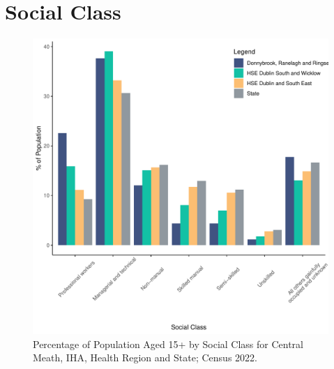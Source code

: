 \documentclass{article}
\begin{document}
\section{Social Class}\label{sect:SC}
\begin{figure}[H]
	\centering
	\includegraphics[width = 140mm]{../figures/SocialClassED.pdf}
	\caption{Percentage of Population Aged 15+ by Social Class for Central Meath, IHA, Health Region and State; Census 2022.}
	\label{fig:vbnv}
	\end{figure}
\end{document}
